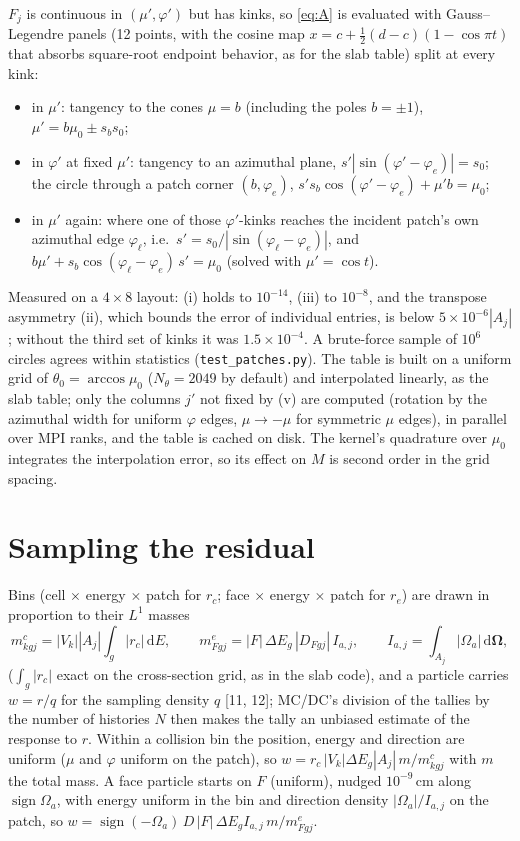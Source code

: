 \documentclass[11pt]{article}
\newcommand{\Om}{\boldsymbol\Omega}
\begin{document}
$F_j$ is continuous in $(\mu',\varphi')$ but has kinks, so \eqref{eq:A} is evaluated
with Gauss--Legendre panels (12 points, with the cosine map
$x=c+\tfrac12(d-c)(1-\cos\pi t)$ that absorbs square-root endpoint behavior, as for
the slab table) split at every kink:
\begin{itemize}
  \item in $\mu'$: tangency to the cones $\mu=b$ (including the poles $b=\pm1$),
  $\mu'=b\mu_0\pm s_bs_0$;
  \item in $\varphi'$ at fixed $\mu'$: tangency to an azimuthal plane,
  $s'|\sin(\varphi'-\varphi_e)|=s_0$; the circle through a patch corner
  $(b,\varphi_e)$, $s's_b\cos(\varphi'-\varphi_e)+\mu'b=\mu_0$;
  \item in $\mu'$ again: where one of those $\varphi'$-kinks reaches the incident
  patch's own azimuthal edge $\varphi_\ell$, i.e.\ $s'=s_0/|\sin(\varphi_\ell-
  \varphi_e)|$, and $b\mu'+s_b\cos(\varphi_\ell-\varphi_e)\,s'=\mu_0$ (solved with
  $\mu'=\cos t$).
\end{itemize}
Measured on a $4\times8$ layout: (i) holds to $10^{-14}$, (iii) to $10^{-8}$, and the
transpose asymmetry (ii), which bounds the error of individual entries, is below
$5\times10^{-6}|A_j|$; without the third set of kinks it was $1.5\times10^{-4}$.
A brute-force sample of $10^6$ circles agrees within statistics
(\texttt{test\_patches.py}). The table is built on a uniform grid of $\theta_0=
\arccos\mu_0$ ($N_\theta=2049$ by default) and interpolated linearly, as the slab
table; only the columns $j'$ not fixed by (v) are computed (rotation by the
azimuthal width for uniform $\varphi$ edges, $\mu\to-\mu$ for symmetric $\mu$
edges), in parallel over MPI ranks, and the table is cached on disk. The kernel's
quadrature over $\mu_0$ integrates the interpolation error, so its effect on $M$ is
second order in the grid spacing.

\section{Sampling the residual}

Bins (cell $\times$ energy $\times$ patch for $r_c$; face $\times$ energy $\times$
patch for $r_e$) are drawn in proportion to their $L^1$ masses
\begin{equation}
  m^c_{kgj} = |V_k||A_j|\int_g |r_c|\,\mathrm dE,\qquad
  m^e_{Fgj} = |F|\,\Delta E_g\,|D_{Fgj}|\,I_{a,j},\qquad
  I_{a,j}=\int_{A_j}|\Omega_a|\,\mathrm d\Om ,
\end{equation}
($\int_g|r_c|$ exact on the cross-section grid, as in the slab code), and a particle
carries $w=r/q$ for the sampling density $q$ [11, 12]; MC/DC's division of the
tallies by the number of histories $N$ then makes the tally an unbiased estimate of
the response to $r$. Within a collision bin the position, energy and direction are
uniform ($\mu$ and $\varphi$ uniform on the patch), so
$w = r_c\,|V_k|\Delta E_g|A_j|\,m/m^c_{kgj}$ with $m$ the total mass. A face particle
starts on $F$ (uniform), nudged $10^{-9}$\,cm along $\operatorname{sign}\Omega_a$,
with energy uniform in the bin and direction density
$|\Omega_a|/I_{a,j}$ on the patch, so $w=\operatorname{sign}(-\Omega_a)\,D\,|F|\,
\Delta E_g I_{a,j}\,m/m^e_{Fgj}$.
\end{document}

